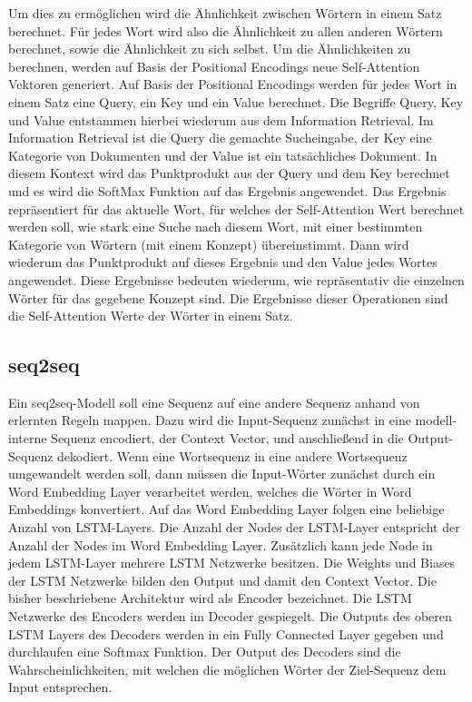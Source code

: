 Um dies zu ermöglichen wird die Ähnlichkeit zwischen Wörtern in einem Satz berechnet.
Für jedes Wort wird also die Ähnlichkeit zu allen anderen Wörtern berechnet, sowie die Ähnlichkeit zu sich selbst.
Um die Ähnlichkeiten zu berechnen, werden auf Basis der Positional Encodings neue Self-Attention Vektoren generiert.
Auf Basis der Positional Encodings werden für jedes Wort in einem Satz eine Query, ein Key und ein Value berechnet.
Die Begriffe Query, Key und Value entstammen hierbei wiederum aus dem Information Retrieval.
Im Information Retrieval ist die Query die gemachte Sucheingabe, der Key eine Kategorie von Dokumenten und der Value ist ein tatsächliches Dokument.
In diesem Kontext wird das Punktprodukt aus der Query und dem Key berechnet und es wird die SoftMax Funktion auf das Ergebnis angewendet.
Das Ergebnis repräsentiert für das aktuelle Wort, für welches der Self-Attention Wert berechnet werden soll, wie stark eine Suche nach diesem Wort, mit einer bestimmten Kategorie von Wörtern (mit einem Konzept) übereinstimmt.
Dann wird wiederum das Punktprodukt auf dieses Ergebnis und den Value jedes Wortes angewendet.
Diese Ergebnisse bedeuten wiederum, wie repräsentativ die einzelnen Wörter für das gegebene Konzept sind.
Die Ergebnisse dieser Operationen sind die Self-Attention Werte der Wörter in einem Satz.

\subsection{seq2seq}
Ein seq2seq-Modell soll eine Sequenz auf eine andere Sequenz anhand von erlernten Regeln mappen.
Dazu wird die Input-Sequenz zunächst in eine modell-interne Sequenz encodiert, der Context Vector, und anschließend in die Output-Sequenz dekodiert.
Wenn eine Wortsequenz in eine andere Wortsequenz umgewandelt werden soll, dann müssen die Input-Wörter zunächst durch ein Word Embedding Layer verarbeitet werden, welches die Wörter in Word Embeddings konvertiert.
Auf das Word Embedding Layer folgen eine beliebige Anzahl von LSTM-Layers.
Die Anzahl der Nodes der LSTM-Layer entspricht der Anzahl der Nodes im Word Embedding Layer.
Zusätzlich kann jede Node in jedem LSTM-Layer mehrere LSTM Netzwerke besitzen.
Die Weights und Biases der LSTM Netzwerke bilden den Output und damit den Context Vector.
Die bisher beschriebene Architektur wird als Encoder bezeichnet.
Die LSTM Netzwerke des Encoders werden im Decoder gespiegelt.
Die Outputs des oberen LSTM Layers des Decoders werden in ein Fully Connected Layer gegeben und durchlaufen eine Softmax Funktion.
Der Output des Decoders sind die Wahrscheinlichkeiten, mit welchen die möglichen Wörter der Ziel-Sequenz dem Input entsprechen. 

